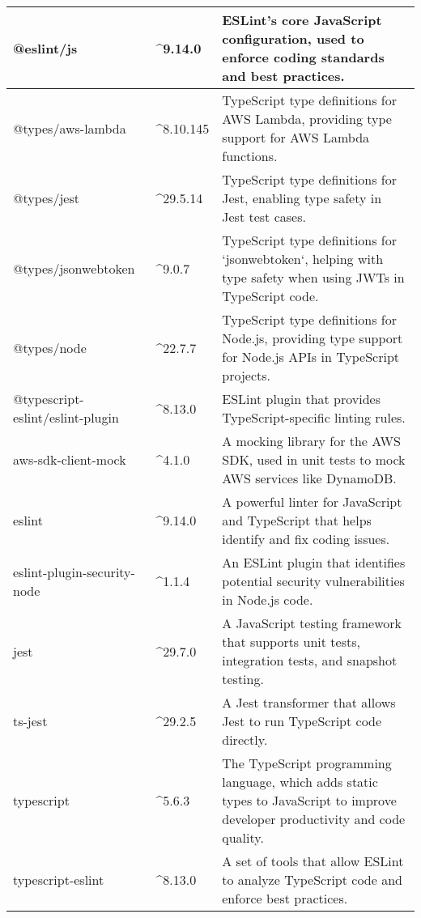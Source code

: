 \begin{longtable}{|l|l|p{8cm}|}
@eslint/js & \textasciicircum 9.14.0 & ESLint's core JavaScript configuration, used to enforce coding standards and best practices. \\ \hline
@types/aws-lambda & \textasciicircum 8.10.145 & TypeScript type definitions for AWS Lambda, providing type support for AWS Lambda functions. \\ \hline
@types/jest & \textasciicircum 29.5.14 & TypeScript type definitions for Jest, enabling type safety in Jest test cases. \\ \hline
@types/jsonwebtoken & \textasciicircum 9.0.7 & TypeScript type definitions for `jsonwebtoken`, helping with type safety when using JWTs in TypeScript code. \\ \hline
@types/node & \textasciicircum 22.7.7 & TypeScript type definitions for Node.js, providing type support for Node.js APIs in TypeScript projects. \\ \hline
@typescript-eslint/eslint-plugin & \textasciicircum 8.13.0 & ESLint plugin that provides TypeScript-specific linting rules. \\ \hline
aws-sdk-client-mock & \textasciicircum 4.1.0 & A mocking library for the AWS SDK, used in unit tests to mock AWS services like DynamoDB. \\ \hline
eslint & \textasciicircum 9.14.0 & A powerful linter for JavaScript and TypeScript that helps identify and fix coding issues. \\ \hline
eslint-plugin-security-node & \textasciicircum 1.1.4 & An ESLint plugin that identifies potential security vulnerabilities in Node.js code. \\ \hline
jest & \textasciicircum 29.7.0 & A JavaScript testing framework that supports unit tests, integration tests, and snapshot testing. \\ \hline
ts-jest & \textasciicircum 29.2.5 & A Jest transformer that allows Jest to run TypeScript code directly. \\ \hline
typescript & \textasciicircum 5.6.3 & The TypeScript programming language, which adds static types to JavaScript to improve developer productivity and code quality. \\ \hline
typescript-eslint & \textasciicircum 8.13.0 & A set of tools that allow ESLint to analyze TypeScript code and enforce best practices. \\ \hline
\end{longtable}
 
 